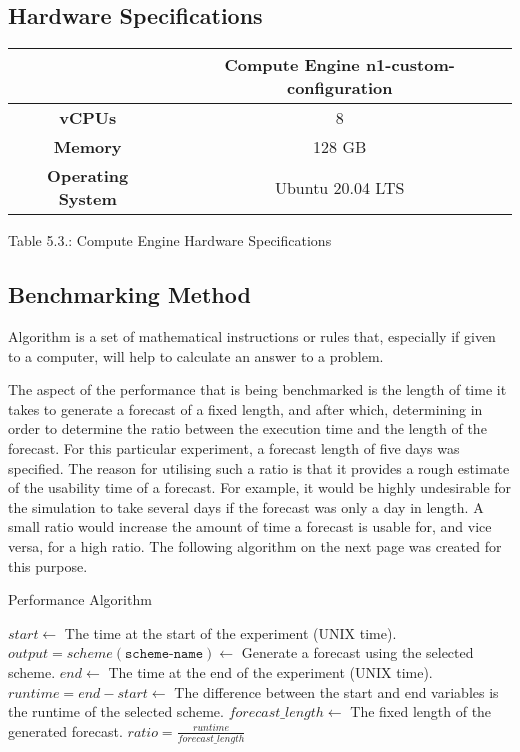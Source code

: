 \subsection{Hardware Specifications}\label{specs}
\begin{center}
\begin{tabular}{|c|c|} 
 \hline
  & Compute Engine n1-custom-configuration \\
 \hline
 \textbf{vCPUs} & 8 \\
 \hline
 \textbf{Memory} & 128 GB \\
 \hline
 \textbf{Operating System} & Ubuntu 20.04 LTS \\
 \hline
\end{tabular}\par
\bigskip
Table 5.3.: Compute Engine Hardware Specifications
\end{center}

\subsection{Benchmarking Method}
\begin{definition}
Algorithm is a set of mathematical instructions or rules that, especially if given to a computer, will help to calculate an answer to a problem.
\end{definition}

The aspect of the performance that is being benchmarked is the length of time it takes to generate a forecast of a fixed length, and after which, determining in order to determine the ratio between the execution time and the length of the forecast. For this particular experiment, a forecast length of five days was specified. The reason for utilising such a ratio is that it provides a rough estimate of the usability time of a forecast. For example, it would be highly undesirable for the simulation to take several days if the forecast was only a day in length. A small ratio would increase the amount of time a forecast is usable for, and vice versa, for a high ratio. The following algorithm on the next page was created for this purpose.

\begin{algorithm}[H]
    \caption{Performance Algorithm}
    \begin{algorithmic}[1]
        \State $ start \gets $ The time at the start of the experiment (UNIX time).
        \State $ output = scheme(\texttt{scheme-name}) \gets $ Generate a forecast using the selected scheme. 
        \State $ end \gets $ The time at the end of the experiment (UNIX time). 
        \State $ runtime = end - start \gets $ The difference between the start and end variables is the runtime of the selected scheme.
        \State $ forecast\_length \gets $ The fixed length of the generated forecast.
        \State $ratio = \frac{runtime}{forecast\_length}$
    \end{algorithmic}
\end{algorithm}

